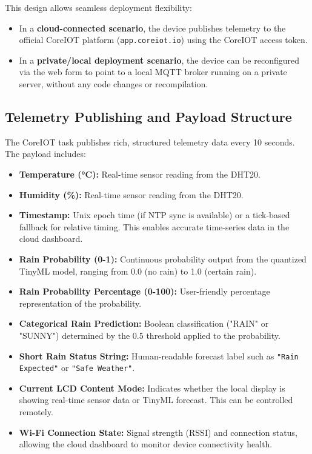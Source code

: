 This design allows seamless deployment flexibility:
\begin{itemize}
  \item In a \textbf{cloud-connected scenario}, the device publishes telemetry to the official CoreIOT platform (\texttt{app.coreiot.io}) using the CoreIOT access token.
  \item In a \textbf{private/local deployment scenario}, the device can be reconfigured via the web form to point to a local MQTT broker running on a private server, without any code changes or recompilation.
\end{itemize}

\subsection*{Telemetry Publishing and Payload Structure}

The CoreIOT task publishes rich, structured telemetry data every 10 seconds. The payload includes:
\begin{itemize}
  \item \textbf{Temperature (°C):} Real-time sensor reading from the DHT20.
  \item \textbf{Humidity (\%):} Real-time sensor reading from the DHT20.
  \item \textbf{Timestamp:} Unix epoch time (if NTP sync is available) or a tick-based fallback for relative timing. This enables accurate time-series data in the cloud dashboard.
  \item \textbf{Rain Probability (0-1):} Continuous probability output from the quantized TinyML model, ranging from 0.0 (no rain) to 1.0 (certain rain).
  \item \textbf{Rain Probability Percentage (0-100):} User-friendly percentage representation of the probability.
  \item \textbf{Categorical Rain Prediction:} Boolean classification ("RAIN" or "SUNNY") determined by the 0.5 threshold applied to the probability.
  \item \textbf{Short Rain Status String:} Human-readable forecast label such as \texttt{"Rain Expected"} or \texttt{"Safe Weather"}.
  \item \textbf{Current LCD Content Mode:} Indicates whether the local display is showing real-time sensor data or TinyML forecast. This can be controlled remotely.
  \item \textbf{Wi-Fi Connection State:} Signal strength (RSSI) and connection status, allowing the cloud dashboard to monitor device connectivity health.
\end{itemize}

